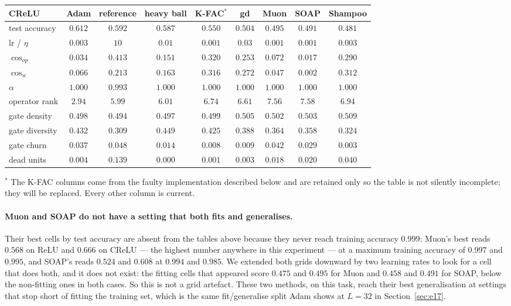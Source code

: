\documentclass{article} %
\theoremstyle{plain}
\theoremstyle{definition}
\theoremstyle{remark}
\begin{document}
\begin{center}\small
\begin{tabular}{lcccccccc}
\toprule
CReLU & Adam & reference & heavy ball & K-FAC$^{\ast}$ & gd & Muon & SOAP & Shampoo \\
\midrule
test accuracy & $\mathbf{0.612}$ & $0.592$ & $0.587$ & $0.550$ & $0.504$ & $0.495$ & $0.491$ & $0.481$ \\
lr / $\eta$ & $0.003$ & $10$ & $0.01$ & $0.001$ & $0.03$ & $0.001$ & $0.001$ & $0.003$ \\
\midrule
$\cos_{op}$ & $0.034$ & $\mathbf{0.413}$ & $0.151$ & $0.320$ & $0.253$ & $0.072$ & $0.017$ & $0.290$ \\
$\cos_w$ & $0.066$ & $0.213$ & $0.163$ & $0.316$ & $0.272$ & $0.047$ & $0.002$ & $0.312$ \\
$\alpha$ & $1.000$ & $0.993$ & $1.000$ & $1.000$ & $1.000$ & $1.000$ & $1.000$ & $1.000$ \\
operator rank & $\mathbf{2.94}$ & $5.99$ & $6.01$ & $6.74$ & $6.61$ & $7.56$ & $7.58$ & $6.94$ \\
gate density & $0.498$ & $\mathbf{0.494}$ & $0.497$ & $0.499$ & $0.505$ & $0.502$ & $0.503$ & $0.509$ \\
gate diversity & $0.432$ & $0.309$ & $0.449$ & $0.425$ & $0.388$ & $0.364$ & $0.358$ & $0.324$ \\
gate churn & $0.037$ & $0.048$ & $0.014$ & $0.008$ & $0.009$ & $0.042$ & $0.029$ & $0.003$ \\
dead units & $0.004$ & $0.139$ & $0.000$ & $0.001$ & $0.003$ & $0.018$ & $0.020$ & $0.040$ \\
\bottomrule
\end{tabular}
\end{center}

\noindent$^{\ast}$ The K-FAC columns come from the faulty implementation described below and are
retained only so the table is not silently incomplete; they will be replaced. Every other column
is current.

\paragraph{Muon and SOAP do not have a setting that both fits and generalises.}
Their best cells by test accuracy are absent from the tables above because they never reach
training accuracy $0.999$: Muon's best reads $0.568$ on ReLU and $0.666$ on CReLU --- the highest
number anywhere in this experiment --- at a maximum training accuracy of $0.997$ and $0.995$, and
SOAP's reads $0.524$ and $0.608$ at $0.994$ and $0.985$. We extended both grids downward by two
learning rates to look for a cell that does both, and it does not exist: the fitting cells that
appeared score $0.475$ and $0.495$ for Muon and $0.458$ and $0.491$ for SOAP, below the
non-fitting ones in both cases. So this is not a grid artefact. These two methods, on this task,
reach their best generalisation at settings that stop short of fitting the training set, which is
the same fit/generalise split Adam shows at $L = 32$ in Section~\ref{sec:e17}.
\end{document}
